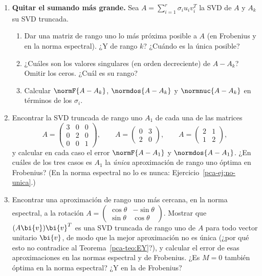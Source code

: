 \begin{enumerate}[leftmargin=*,label=\textbf{\thechapter.\arabic*},ref=\thechapter.\arabic*,itemsep=4pt]
\item {} \textbf{Quitar el sumando más grande.} Sea
$A=\sum_{i=1}^r\sigma_iu_iv_i^T$ la SVD de $A$ y $A_k$ su SVD truncada.
\begin{enumerate}[label=(\alph*)]
\item Dar una matriz de rango uno lo más próxima posible a $A$ (en Frobenius y
en la norma espectral). ¿Y de rango $k$? ¿Cuándo es la única posible?
\item ¿Cuáles son los valores singulares (en orden decreciente) de $A-A_k$?
Omitir los ceros. ¿Cuál es su rango?
\item Calcular $\normF{A-A_k}$, $\normdos{A-A_k}$ y $\normnuc{A-A_k}$ en
términos de los $\sigma_i$.
\end{enumerate}

\item {} Encontrar la SVD truncada de rango uno $A_1$ de cada una
de las matrices
\[
A=\begin{pmatrix}3&0&0\\0&2&0\\0&0&1\end{pmatrix},\qquad
A=\begin{pmatrix}0&3\\2&0\end{pmatrix},\qquad
A=\begin{pmatrix}2&1\\1&2\end{pmatrix},
\]
y calcular en cada caso el error $\normF{A-A_1}$ y $\normdos{A-A_1}$. ¿En
cuáles de los tres casos es $A_1$ la \emph{única} aproximación de rango uno
óptima en Frobenius? (En la norma espectral no lo es nunca:
Ejercicio~\ref{pca-ej:no-unica}.)

\item {} Encontrar una aproximación de rango uno más cercana, en
la norma espectral, a la rotación
$A=\left(\begin{smallmatrix}\cos\theta&-\sin\theta\\\sin\theta&\cos\theta\end{smallmatrix}\right)$.
Mostrar que $(A\bi{v})\bi{v}^T$ es una SVD truncada de rango uno de $A$ para todo
vector unitario $\bi{v}$, de modo que la mejor aproximación no es única (¿por qué
esto no contradice al Teorema~\ref{pca-teo:EY}?), y calcular el error de esas
aproximaciones en las normas espectral y de Frobenius. ¿Es $M=0$ también
óptima en la norma espectral? ¿Y en la de Frobenius?


\end{enumerate}
